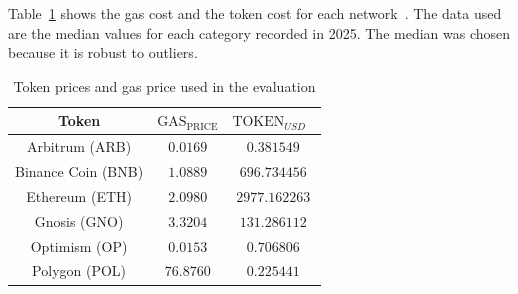 Table~\ref{tab:proto-evaluation-gas-cost} shows the gas cost and the token cost for each network~\cite{etherscan, polygonscan, arbiscan, optimisticetherscan, gnosisscan, bscscan}.
The data used are the median values for each category recorded in 2025.
The median was chosen because it is robust to outliers.
\begin{table}
    \centering
    \begin{tabular}{|c|c|c|}
        \hline
        Token & $\text{GAS}_{\text{PRICE}}$ & $\text{TOKEN}_{USD}$~\cite{coingecko} \\
        \hline
        Arbitrum (ARB) & $0.0169$ & $0.381549$ \\
        \hline
        Binance Coin (BNB) & $1.0889$ & $696.734456$ \\
        \hline
        Ethereum (ETH) & $2.0980$ & $2977.162263$ \\
        \hline
        Gnosis (GNO) & $3.3204$ & $131.286112$ \\
        \hline
        Optimism (OP) & $0.0153$ & $0.706806$ \\
        \hline
        Polygon (POL) & $76.8760$ & $0.225441$ \\
        \hline
    \end{tabular}%
    \caption{Token prices and gas price used in the evaluation}
    \label{tab:proto-evaluation-gas-cost}
\end{table}

